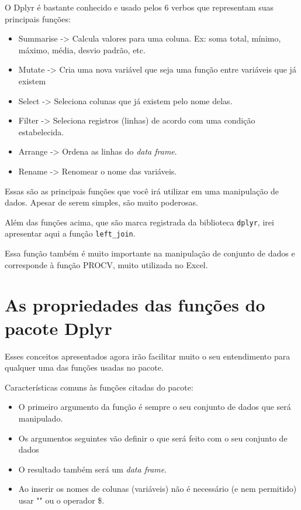 \documentclass[
]{book}
\providecommand{\tightlist}{%
  \setlength{\itemsep}{0pt}\setlength{\parskip}{0pt}}
\begin{document}
O Dplyr é bastante conhecido e usado pelos 6 verbos que representam suas
principais funções:

\begin{itemize}
\tightlist
\item
  Summarise -\textgreater{} Calcula valores para uma coluna. Ex: soma
  total, mínimo, máximo, média, desvio padrão, etc.
\item
  Mutate -\textgreater{} Cria uma nova variável que seja uma função
  entre variáveis que já existem
\item
  Select -\textgreater{} Seleciona colunas que já existem pelo nome
  delas.
\item
  Filter -\textgreater{} Seleciona registros (linhas) de acordo com uma
  condição estabelecida.
\item
  Arrange -\textgreater{} Ordena as linhas do \emph{data frame}.
\item
  Rename -\textgreater{} Renomear o nome das variáveis.
\end{itemize}

Essas são as principais funções que você irá utilizar em uma manipulação
de dados. Apesar de serem simples, são muito poderosas.

Além das funções acima, que são marca registrada da biblioteca
\texttt{dplyr}, irei apresentar aqui a função \texttt{left\_join}.

Essa função também é muito importante na manipulação de conjunto de
dados e corresponde à função PROCV, muito utilizada no Excel.

\hypertarget{as-propriedades-das-funuxe7uxf5es-do-pacote-dplyr}{%
\section{As propriedades das funções do pacote
Dplyr}\label{as-propriedades-das-funuxe7uxf5es-do-pacote-dplyr}}

Esses conceitos apresentados agora irão facilitar muito o seu
entendimento para qualquer uma das funções usadas no pacote.

Características comuns às funções citadas do pacote:

\begin{itemize}
\tightlist
\item
  O primeiro argumento da função é sempre o seu conjunto de dados que
  será manipulado.
\item
  Os argumentos seguintes vão definir o que será feito com o seu
  conjunto de dados
\item
  O resultado também será um \emph{data frame}.
\item
  Ao inserir os nomes de colunas (variáveis) não é necessário (e nem
  permitido) usar "" ou o operador \$.
\end{itemize}
\end{document}

